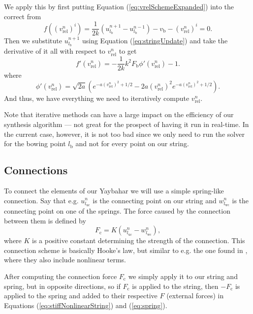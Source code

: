 \documentclass{article}
\begin{document}
We apply this by first putting Equation (\ref{eq:vrelSchemeExpanded}) into the correct from
\begin{equation}
  f((v_\text{rel}^n)^i) = \frac{1}{2k} \left(u^{n+1}_{l_\text{b}} - u^{n-1}_{l_\text{b}} \right) - v_\text{b} - (v_\text{rel}^n)^i = 0.
\end{equation}
Then we substitute $u^{n+1}_{l_\text{b}}$ using Equation (\ref{eq:stringUpdate}) and take the derivative of it all with respect to $v_\text{rel}^n$ to get
\begin{equation}
  f'(v_\text{rel}^n) = - \frac{1}{2k} k^2 F_\text{b} \phi'(v_\text{rel}^n) - 1.
\end{equation}
where
\begin{equation}
  \phi'(v_\text{rel}^n) = \sqrt{2 a} \left(e^{-a (v_\text{rel}^n)^2 + 1/2} - 2 a (v_\text{rel}^n)^2 e^{-a (v_\text{rel}^n)^2 + 1/2} \right).
\end{equation}
And thus, we have everything we need to iteratively compute $v_\text{rel}^n$.

Note that iterative methods can have a large impact on the efficiency of our synthesis algorithm --- not great for the prospect of having it run in real-time.
In the current case, however, it is not too bad since we only need to run the solver for the bowing point $l_\text{b}$ and not for every point on our string.

\subsection{Connections}
\label{sec:connections}

To connect the elements of our Yaybahar we will use a simple spring-like connection.
Say that e.g. $u^n_{l_\text{uc}}$ is the connecting point on our string and $w^n_{l_\text{wc}}$ is the connecting point on one of the springs.
The force caused by the connection between them is defined by
\begin{equation}
  F_\text{c} = K \left(u^n_{l_\text{uc}} - w^n_{l_\text{wc}}\right),
\end{equation}
where $K$ is a positive constant determining the strength of the connection. This connection scheme is basically Hooke's law, but similar to e.g. the one found in \cite{bilbao_modular_2009}, where they also include nonlinear terms.

After computing the connection force $F_\text{c}$ we simply apply it to our string and spring, but in opposite directions, so if $F_\text{c}$ is applied to the string, then $-F_\text{c}$ is applied to the spring and added to their respective $F$ (external forces) in Equations (\ref{eq:stiffNonlinearString}) and (\ref{eq:spring}).
\end{document}
